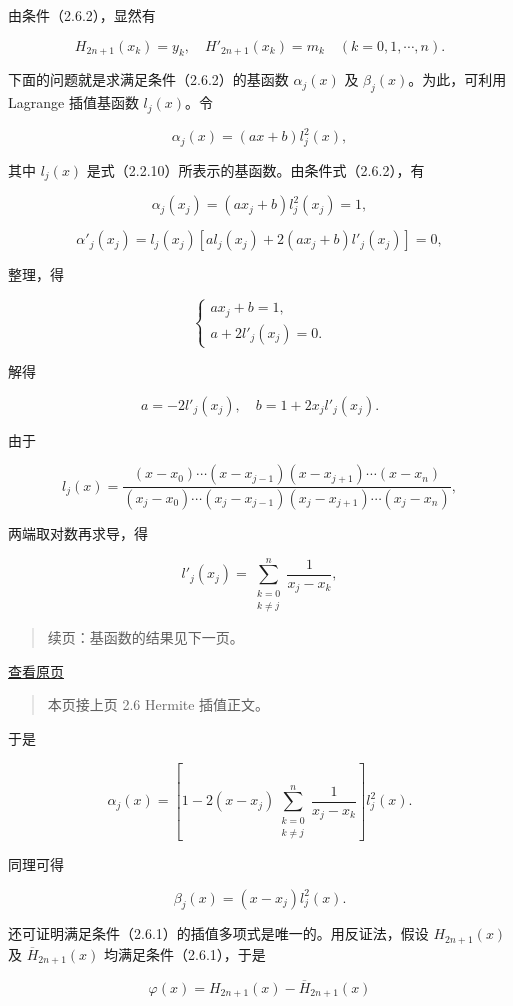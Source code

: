 \documentclass[
  10pt,
  fontset=fandol]{ctexart}
\begin{document}
由条件（2.6.2），显然有

\[H_{2n+1}(x_k)=y_k,\quad H'_{2n+1}(x_k)=m_k\quad(k=0,1,\cdots,n).\]

下面的问题就是求满足条件（2.6.2）的基函数 \(\alpha_j(x)\) 及 \(\beta_j(x)\)。为此，可利用 Lagrange 插值基函数 \(l_j(x)\)。令

\[\alpha_j(x)=(ax+b)l_j^2(x),\]

其中 \(l_j(x)\) 是式（2.2.10）所表示的基函数。由条件式（2.6.2），有

\[\alpha_j(x_j)=(ax_j+b)l_j^2(x_j)=1,\]

\[\alpha'_j(x_j)=l_j(x_j)[al_j(x_j)+2(ax_j+b)l'_j(x_j)]=0,\]

整理，得

\[\begin{cases}ax_j+b=1,\\a+2l'_j(x_j)=0.\end{cases}\]

解得

\[a=-2l'_j(x_j),\quad b=1+2x_jl'_j(x_j).\]

由于

\[l_j(x)=\frac{(x-x_0)\cdots(x-x_{j-1})(x-x_{j+1})\cdots(x-x_n)}{(x_j-x_0)\cdots(x_j-x_{j-1})(x_j-x_{j+1})\cdots(x_j-x_n)},\]

两端取对数再求导，得

\[l'_j(x_j)=\sum_{\substack{k=0\\k\ne j}}^{n}\frac{1}{x_j-x_k},\]

\begin{quote}
续页：基函数的结果见下一页。
\end{quote}

\href{../../source-images/pdf-044.jpeg}{查看原页}

\begin{quote}
本页接上页 2.6 Hermite 插值正文。
\end{quote}

于是

\[\alpha_j(x)=\left[1-2(x-x_j)\sum_{\substack{k=0\\k\ne j}}^n\frac{1}{x_j-x_k}\right]l_j^2(x).\tag{2.6.4}\]

同理可得

\[\beta_j(x)=(x-x_j)l_j^2(x).\tag{2.6.5}\]

还可证明满足条件（2.6.1）的插值多项式是唯一的。用反证法，假设 \(H_{2n+1}(x)\) 及 \(\overline H_{2n+1}(x)\) 均满足条件（2.6.1），于是

\[\varphi(x)=H_{2n+1}(x)-\overline H_{2n+1}(x)\]
\end{document}
